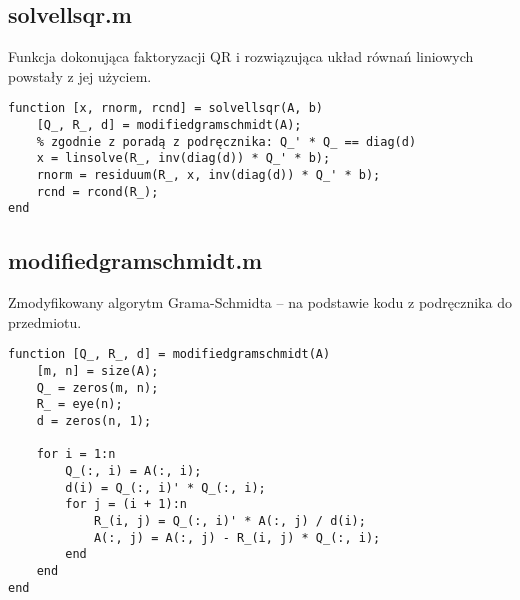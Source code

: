 \documentclass[12pt]{article}
\begin{document}
\subsection{solvellsqr.m}
Funkcja dokonująca faktoryzacji QR i rozwiązująca układ równań liniowych powstały z jej użyciem.
\begin{verbatim}
function [x, rnorm, rcnd] = solvellsqr(A, b)
    [Q_, R_, d] = modifiedgramschmidt(A);
    % zgodnie z poradą z podręcznika: Q_' * Q_ == diag(d)
    x = linsolve(R_, inv(diag(d)) * Q_' * b);
    rnorm = residuum(R_, x, inv(diag(d)) * Q_' * b);
    rcnd = rcond(R_);
end
\end{verbatim}

\subsection{modifiedgramschmidt.m}
Zmodyfikowany algorytm Grama-Schmidta -- na podstawie kodu z podręcznika do przedmiotu.
\begin{verbatim}
function [Q_, R_, d] = modifiedgramschmidt(A)
    [m, n] = size(A);
    Q_ = zeros(m, n);
    R_ = eye(n);
    d = zeros(n, 1);

    for i = 1:n
        Q_(:, i) = A(:, i);
        d(i) = Q_(:, i)' * Q_(:, i);
        for j = (i + 1):n
            R_(i, j) = Q_(:, i)' * A(:, j) / d(i);
            A(:, j) = A(:, j) - R_(i, j) * Q_(:, i);
        end
    end
end
\end{verbatim}
\end{document}

